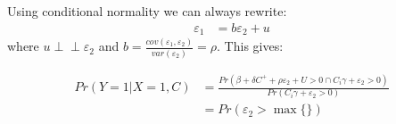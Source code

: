 \documentclass{article}
\newcommand{\indep}{\perp \!\!\! \perp}
\begin{document}
Using conditional normality we can always rewrite:
\begin{align*}
    \varepsilon_1 &= b\varepsilon_2 + u
\end{align*}
where $u \indep \varepsilon_2$ and $b = \frac{cov(\varepsilon_1, \varepsilon_2)}{var(\varepsilon_2)} = \rho$. 
This gives:

\begin{align*}
    Pr(Y = 1 | X = 1, C) &= \frac{Pr(\beta + \delta C^+ + \rho \varepsilon_2 + U > 0 \cap C_i \gamma + \varepsilon_2  > 0)}{
    Pr(C_i \gamma + \varepsilon_2 > 0)} \\
    &= Pr(\varepsilon_2 > \max \{\})
\end{align*}
\end{document}
